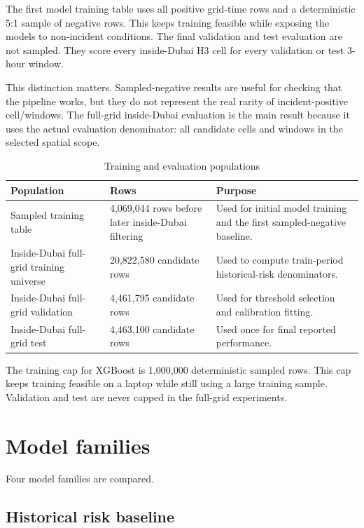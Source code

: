 The first model training table uses all positive grid-time rows and a deterministic 5:1 sample of negative rows. This keeps training feasible while exposing the models to non-incident conditions. The final validation and test evaluation are not sampled. They score every inside-Dubai H3 cell for every validation or test 3-hour window.

This distinction matters. Sampled-negative results are useful for checking that the pipeline works, but they do not represent the real rarity of incident-positive cell/windows. The full-grid inside-Dubai evaluation is the main result because it uses the actual evaluation denominator: all candidate cells and windows in the selected spatial scope.

\begin{table}[H]
\centering
\caption{Training and evaluation populations}
\label{tab:training_evaluation_populations}
\small
\begin{tabularx}{\textwidth}{L{0.28\textwidth}L{0.22\textwidth}Y}
\toprule
\textbf{Population} & \textbf{Rows} & \textbf{Purpose} \\
\midrule
Sampled training table & 4,069,044 rows before later inside-Dubai filtering & Used for initial model training and the first sampled-negative baseline. \\
Inside-Dubai full-grid training universe & 20,822,580 candidate rows & Used to compute train-period historical-risk denominators. \\
Inside-Dubai full-grid validation & 4,461,795 candidate rows & Used for threshold selection and calibration fitting. \\
Inside-Dubai full-grid test & 4,463,100 candidate rows & Used once for final reported performance. \\
\bottomrule
\end{tabularx}
\end{table}

The training cap for XGBoost is 1,000,000 deterministic sampled rows. This cap keeps training feasible on a laptop while still using a large training sample. Validation and test are never capped in the full-grid experiments.

\section{Model families}

Four model families are compared.

\subsection{Historical risk baseline}

